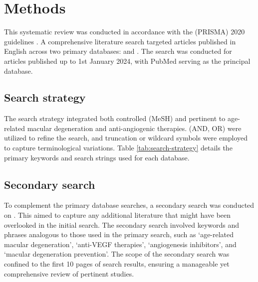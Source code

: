 \section{Methods}\label{s:methods}

This systematic review was conducted in accordance with the  (PRISMA) 2020 guidelines \cite{page2021}. A comprehensive literature search targeted articles published in English across two primary databases:  and . The search was conducted for articles published up to 1st January 2024, with PubMed serving as the principal database.

\subsection{Search strategy}\label{s:search-strategy}
The search strategy integrated both controlled  (MeSH) and  pertinent to age-related macular degeneration and anti-angiogenic therapies.  (AND, OR) were utilized to refine the search, and truncation or wildcard symbols were employed to capture terminological variations. Table \ref{tab:search-strategy} details the primary keywords and search strings used for each database.



\subsection{Secondary search}\label{s:secondary-search}
To complement the primary database searches, a secondary search was conducted on . This aimed to capture any additional literature that might have been overlooked in the initial search. The secondary search involved keywords and phrases analogous to those used in the primary search, such as `age-related macular degeneration', `anti-VEGF therapies', `angiogenesis inhibitors', and `macular degeneration prevention'. The scope of the secondary search was confined to the first 10 pages of search results, ensuring a manageable yet comprehensive review of pertinent studies.

\newpage

